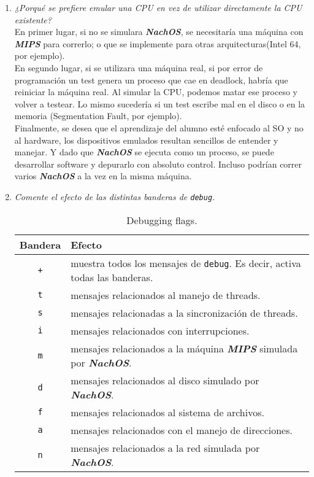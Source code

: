 \begin{enumerate}
\item \textit{¿Porqué se prefiere emular una CPU en vez de utilizar directamente la CPU existente?}\\
En primer lugar, si no se simulara \textbf{\textit{NachOS}}, se necesitaría una máquina con \textbf{\textit{MIPS}} para correrlo; o que se implemente para otras arquitecturas(Intel 64, por ejemplo).\\
En segundo lugar, si se utilizara una máquina real, si por error de programación un test genera un proceso que cae en deadlock, habría que reiniciar la máquina real. Al simular la CPU, podemos matar ese proceso y volver a testear. Lo mismo sucedería si un test escribe mal en el disco o en la memoria (Segmentation Fault, por ejemplo).\\
Finalmente, se desea que el aprendizaje del alumno esté enfocado al SO y no al hardware, los dispositivos emulados resultan sencillos de entender y manejar. Y dado que \textbf{\textit{NachOS}} se ejecuta como un proceso, se puede desarrollar software y depurarlo con absoluto control. Incluso podrían correr varios \textbf{\textit{NachOS}} a la vez en la misma máquina.\newpage

\item \textit{Comente el efecto de las distintas banderas de \texttt{debug}.}

\begin{table}[!h]
	\center
    \begin{tabular}{|c|l|}
\hline
Bandera & Efecto \\
\hline
\texttt{+} & muestra todos los mensajes de \texttt{debug}. Es decir, activa todas las banderas. \\
\texttt{t} & mensajes relacionados al manejo de threads.    \\
\texttt{s} & mensajes relacionadas a la sincronización de threads.    \\
\texttt{i} & mensajes relacionados con interrupciones.\\
\texttt{m} & mensajes relacionados a la máquina \textbf{\textit{MIPS}} simulada por \textbf{\textit{NachOS}}.  \\
\texttt{d} & mensajes relacionados al disco simulado por \textbf{\textit{NachOS}}.    \\
\texttt{f} & mensajes relacionados al sistema de archivos.    \\
\texttt{a} & mensajes relacionados con el manejo de direcciones.\\
\texttt{n} & mensajes relacionados a la red simulada por \textbf{\textit{NachOS}}.\\
\hline
    \end{tabular}
    \caption{Debugging flags.}
    \label{debugging_flags}
\end{table}


\end{enumerate}
